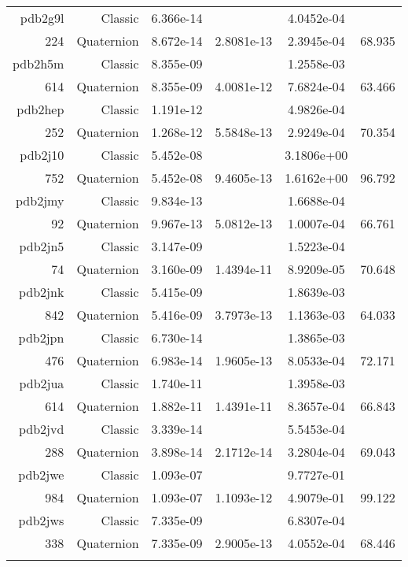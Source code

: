 \begin{xltabular}{\textwidth}{r|rS[table-format=1.3e+2]S[table-format=1.4e+2]S[table-format=1.4e+2]S[table-format=-1.3]}
pdb2g9l & Classic & 6.366e-14 &  & 4.0452e-04 & \\
224 & Quaternion & 8.672e-14 & 2.8081e-13 & 2.3945e-04 & 68.935\\  \addlinespace
pdb2h5m & Classic & 8.355e-09 &  & 1.2558e-03 & \\
614 & Quaternion & 8.355e-09 & 4.0081e-12 & 7.6824e-04 & 63.466\\  \addlinespace
pdb2hep & Classic & 1.191e-12 &  & 4.9826e-04 & \\
252 & Quaternion & 1.268e-12 & 5.5848e-13 & 2.9249e-04 & 70.354\\  \addlinespace
pdb2j10 & Classic & 5.452e-08 &  & 3.1806e+00 & \\
752 & Quaternion & 5.452e-08 & 9.4605e-13 & 1.6162e+00 & 96.792\\  \addlinespace
pdb2jmy & Classic & 9.834e-13 &  & 1.6688e-04 & \\
92 & Quaternion & 9.967e-13 & 5.0812e-13 & 1.0007e-04 & 66.761\\  \addlinespace
pdb2jn5 & Classic & 3.147e-09 &  & 1.5223e-04 & \\
74 & Quaternion & 3.160e-09 & 1.4394e-11 & 8.9209e-05 & 70.648\\  \addlinespace
pdb2jnk & Classic & 5.415e-09 &  & 1.8639e-03 & \\
842 & Quaternion & 5.416e-09 & 3.7973e-13 & 1.1363e-03 & 64.033\\  \addlinespace
pdb2jpn & Classic & 6.730e-14 &  & 1.3865e-03 & \\
476 & Quaternion & 6.983e-14 & 1.9605e-13 & 8.0533e-04 & 72.171\\  \addlinespace
pdb2jua & Classic & 1.740e-11 &  & 1.3958e-03 & \\
614 & Quaternion & 1.882e-11 & 1.4391e-11 & 8.3657e-04 & 66.843\\  \addlinespace
pdb2jvd & Classic & 3.339e-14 &  & 5.5453e-04 & \\
288 & Quaternion & 3.898e-14 & 2.1712e-14 & 3.2804e-04 & 69.043\\  \addlinespace
pdb2jwe & Classic & 1.093e-07 &  & 9.7727e-01 & \\
984 & Quaternion & 1.093e-07 & 1.1093e-12 & 4.9079e-01 & 99.122\\  \addlinespace
pdb2jws & Classic & 7.335e-09 &  & 6.8307e-04 & \\
338 & Quaternion & 7.335e-09 & 2.9005e-13 & 4.0552e-04 & 68.446\\  \addlinespace

\end{xltabular}
